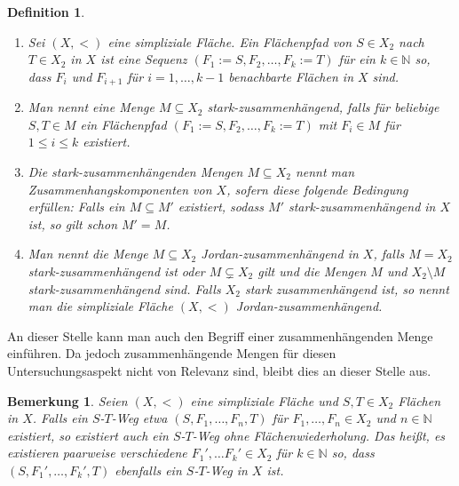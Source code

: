 \documentclass[12pt,titlepage,twoside,cleardoublepage]{article}
\theoremstyle{nummermitklammern}
\newtheorem{definition}[temp]{Definition}
\newtheorem{bemerkung}[temp]{Bemerkung}
\newtheorem{definition}[zahl]{Definition}
\newtheorem{bemerkung}[zahl]{Bemerkung}
\numberwithin{equation}{section}
\begin{document}
\begin{definition} 

\begin{enumerate}
\item Sei $(X,<)$ eine simpliziale Fläche. Ein \emph{Flächenpfad} von $S\in X_{2}$ nach $T \in X_{2}$ in $X$ ist eine Sequenz $(F_1:=S,F_{2},\ldots,F_{k}:=T)$ für ein $k \in \mathbb{N}$ so, dass $F_{i} $ und $F_{i+1}$ für $i=1,\ldots,k-1$ benachbarte Flächen in $X$ sind.\cite{SS}
\item Man nennt eine Menge $M\subseteq X_2$  \emph{stark-zusammenhängend}, falls für beliebige $S,T \in M$ ein Flächenpfad $(F_{1}:=S,F_{2},\ldots,F_{k}:=T)$ mit $F_i \in M$ für $1\leq i \leq k$ existiert. 
 \item Die stark-zusammenhängenden Mengen $M\subseteq X_2$ nennt man \emph{Zusammenhangskomponenten von $X$}, sofern diese folgende Bedingung erfüllen: Falls ein $M\subseteq M'$ existiert, sodass $M'$ stark-zusammenhängend in $X$ ist, so gilt schon $M'=M$.\cite{SS}
 \item Man nennt die Menge $M \subseteq X_2$ \emph{Jordan-zusammenhängend} in $X$, falls $M=X_2$ stark-zusammenhängend ist oder  $M \subsetneq X_2$ gilt und die Mengen $M$ und $X_2\setminus M$ stark-zusammenhängend sind. Falls $X_2$ stark zusammenhängend ist, so nennt man die simpliziale Fläche $(X,<)$ Jordan-zusammenhängend.
\end {enumerate}
\end{definition}
An dieser Stelle kann man auch den Begriff einer zusammenhängenden Menge einführen. Da jedoch zusammenhängende Mengen für diesen Untersuchungsaspekt nicht von Relevanz sind, bleibt dies an dieser Stelle aus.
\begin{bemerkung}
 Seien $(X,<)$ eine simpliziale Fläche und $S,T \in X_2$ Flächen in $X$.
  Falls ein $S$-$T$-Weg etwa $(S,F_1,\ldots,F_n,T)$ für $F_1,\ldots,F_n \in X_2$ und $n \in \mathbb{N}$ existiert, so existiert auch ein $S$-$T$-Weg ohne \emph{Flächenwiederholung}.
   Das heißt, es existieren paarweise verschiedene $F_1',\ldots F_k'\in X_2$ für $k \in \mathbb{N}$ so, dass $(S,F_1',\ldots,F_k',T)$ ebenfalls ein $S$-$T$-Weg in $X$ ist.
\end{bemerkung}
\end{document}
